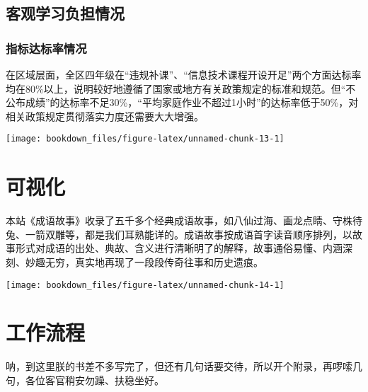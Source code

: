 \documentclass[hyperref, a4paper, UTF8, zihao = -4, linespread = 1]{ctexbook}
\begin{document}
\hypertarget{ux5ba2ux89c2ux5b66ux4e60ux8d1fux62c5ux60c5ux51b5}{%
\section{客观学习负担情况}\label{ux5ba2ux89c2ux5b66ux4e60ux8d1fux62c5ux60c5ux51b5}}

\hypertarget{ux6307ux6807ux8fbeux6807ux7387ux60c5ux51b5}{%
\subsection{指标达标率情况}\label{ux6307ux6807ux8fbeux6807ux7387ux60c5ux51b5}}

在区域层面，全区四年级在``违规补课''、``信息技术课程开设开足''两个方面达标率均在80\%以上，说明较好地遵循了国家或地方有关政策规定的标准和规范。但``不公布成绩''的达标率不足30\%，``平均家庭作业不超过1小时''的达标率低于50\%，对相关政策规定贯彻落实力度还需要大大增强。

\begin{center}\texttt{[image: bookdown\_files/figure-latex/unnamed-chunk-13-1]} \end{center}

\hypertarget{visul}{%
\chapter{可视化}\label{visul}}

本站《成语故事》收录了五千多个经典成语故事，如八仙过海、画龙点睛、守株待兔、一箭双雕等，都是我们耳熟能详的。成语故事按成语首字读音顺序排列，以故事形式对成语的出处、典故、含义进行清晰明了的解释，故事通俗易懂、内涵深刻、妙趣无穷，真实地再现了一段段传奇往事和历史遗痕。

\begin{center}\texttt{[image: bookdown\_files/figure-latex/unnamed-chunk-14-1]} \end{center}

\cleardoublepage

\hypertarget{appendix-ux9644ux5f55}{%
\appendix {}}


\hypertarget{sound}{%
\chapter{工作流程}\label{sound}}

呐，到这里朕的书差不多写完了，但还有几句话要交待，所以开个附录，再啰嗦几句，各位客官稍安勿躁、扶稳坐好。
\end{document}
